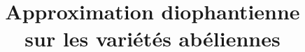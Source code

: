 \documentclass[nomencl]{mpg-preth}
\title{Approximation diophantienne \\ sur les variétés abéliennes}
\begin{document}
\maketitle

\setupmagicinclude






\appendix




\clearpage
\printbibliography
\end{document}
